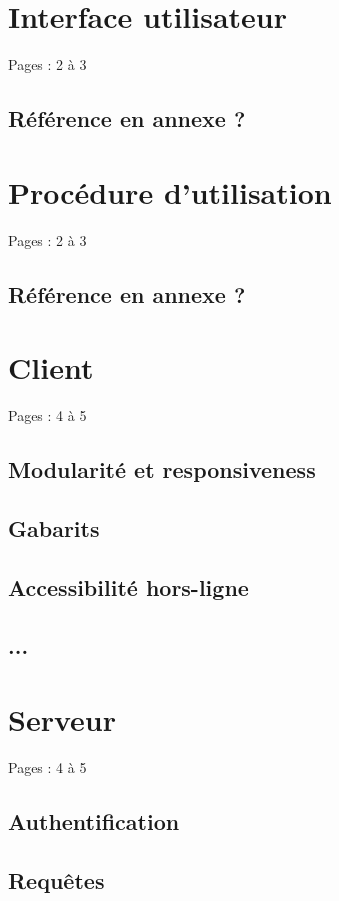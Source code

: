 \documentclass{eplmastersthesis_FR}
\begin{document}
		\section{Interface utilisateur}

			Pages : 2 à 3

			\subsection*{Référence en annexe ?}

		\section{Procédure d'utilisation}

			Pages : 2 à 3

			\subsection*{Référence en annexe ?}

		\section{Client}

			Pages : 4 à 5
			\subsection*{Modularité et responsiveness}
			\subsection*{Gabarits}
			\subsection*{Accessibilité hors-ligne}
			\subsection*{...}

		\section{Serveur}

			Pages : 4 à 5
			\subsection*{Authentification}
			\subsection*{Requêtes}
\end{document}
